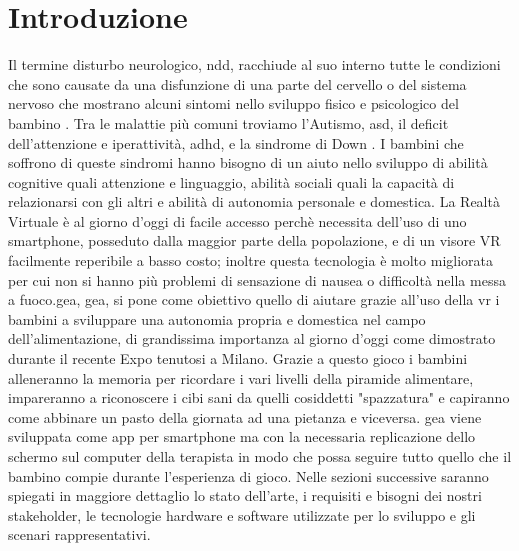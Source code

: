 \section{Introduzione} \label{sec:intro}
Il termine disturbo neurologico, \acs{ndd}, racchiude al suo interno tutte le condizioni che sono causate da una disfunzione di una parte del cervello o del sistema nervoso che mostrano alcuni sintomi nello sviluppo fisico e psicologico del bambino \cite{rif1}. Tra le malattie più comuni troviamo l'Autismo, \acs{asd}, il deficit dell'attenzione e iperattività, \acs{adhd}, e la sindrome di Down \cite{rif2}. I bambini che soffrono di queste sindromi hanno bisogno di un aiuto nello sviluppo di abilità cognitive quali attenzione e linguaggio, abilità sociali quali la capacità di relazionarsi con gli altri e abilità di autonomia personale e domestica. La Realtà Virtuale è al giorno d'oggi di facile accesso perchè necessita dell'uso di uno smartphone, posseduto dalla maggior parte della popolazione, e di un visore VR facilmente reperibile a basso costo; inoltre questa tecnologia è molto migliorata  per cui non si hanno più problemi di sensazione di nausea o difficoltà nella messa a fuoco.\acs{gea}, \acl{gea}, si pone come obiettivo quello di aiutare grazie all'uso della \acs{vr} i bambini a sviluppare una autonomia propria e domestica nel campo dell'alimentazione, di grandissima importanza al giorno d'oggi come dimostrato durante il recente Expo tenutosi a Milano. Grazie a questo gioco i bambini alleneranno la memoria per ricordare i vari livelli della piramide alimentare, impareranno a riconoscere i cibi sani da quelli cosiddetti "spazzatura" e capiranno come abbinare un pasto della giornata ad una pietanza e viceversa. \acs{gea} viene sviluppata come app per smartphone ma con la necessaria replicazione dello schermo sul computer della terapista in modo che possa seguire tutto quello che il bambino compie durante l'esperienza di gioco. Nelle sezioni successive saranno spiegati in maggiore dettaglio lo stato dell'arte, i requisiti e bisogni dei nostri stakeholder, le tecnologie hardware e software utilizzate per lo sviluppo e gli scenari rappresentativi.